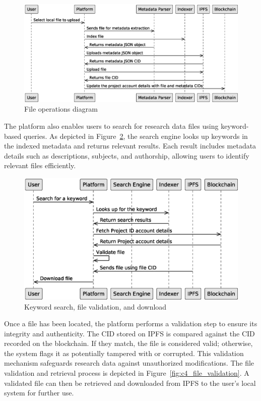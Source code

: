 \documentclass[final]{rc-book-2.14}
\begin{document}
\begin{figure}[htbp]
    \centering
    \includegraphics[scale=0.5]{fig/c4_platform_operations_2.eps}
    \caption{File operations diagram}
    \label{fig:c4_file_operations_diagram}
\end{figure}

The platform also enables users to search for research data files using keyword-based queries. As depicted in Figure~\ref{fig:c4_keyword_search}, the search engine looks up keywords in the indexed metadata and returns relevant results. Each result includes metadata details such as descriptions, subjects, and authorship, allowing users to identify relevant files efficiently.

\begin{figure}[htbp]
    \centering
    \includegraphics[scale=0.5]{fig/c4_searching_and_validation.eps}
    \caption{Keyword search, file validation, and download}
    \label{fig:c4_keyword_search}
\end{figure}

Once a file has been located, the platform performs a validation step to ensure its integrity and authenticity. The CID stored on IPFS is compared against the CID recorded on the blockchain. If they match, the file is considered valid; otherwise, the system flags it as potentially tampered with or corrupted. This validation mechanism safeguards research data against unauthorized modifications. The file validation and retrieval process is depicted in Figure~\ref{fig:c4_file_validation}. A validated file can then be retrieved and downloaded from IPFS to the user's local system for further use.
\end{document}
